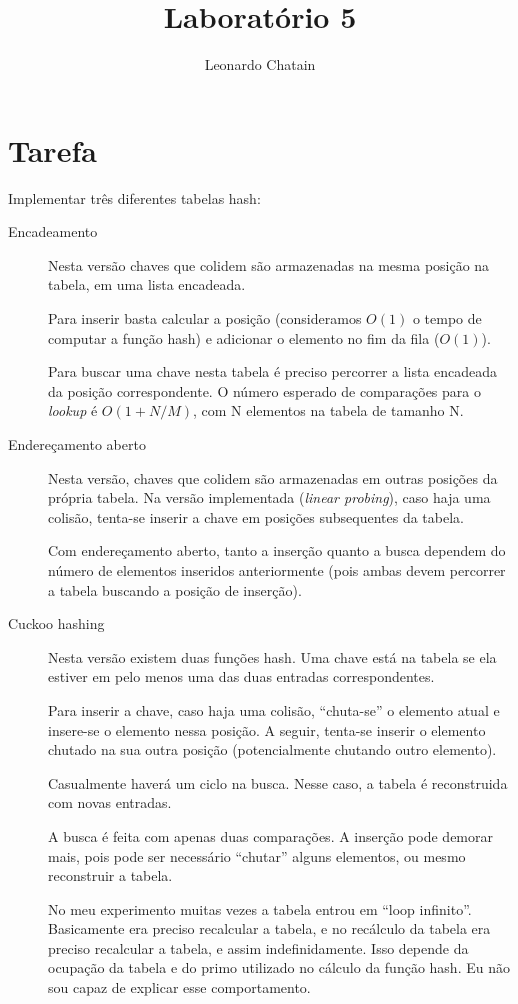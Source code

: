\documentclass{article}
\title{Laboratório 5}
\author{Leonardo Chatain}
\begin{document}
\maketitle

\section{Tarefa}
Implementar três diferentes tabelas hash:

\begin{description}
 \item[Encadeamento] Nesta versão chaves que colidem são armazenadas na mesma posição na
tabela, em uma lista encadeada.

Para inserir basta calcular a posição (consideramos $O(1)$ o tempo de computar a função hash) e
adicionar o elemento no fim da fila ($O(1)$).

Para buscar uma chave nesta tabela é preciso percorrer a lista encadeada da posição
correspondente. O número esperado de comparações para o \emph{lookup} é $O(1 + N/M)$, com N
elementos na tabela de tamanho N.

 \item[Endereçamento aberto] Nesta versão, chaves que colidem são armazenadas em outras
posições da própria tabela. Na versão implementada (\emph{linear probing}), caso haja uma colisão,
tenta-se inserir a chave em posições subsequentes da tabela.

Com endereçamento aberto, tanto a inserção quanto a busca dependem do número de elementos inseridos
anteriormente (pois ambas devem percorrer a tabela buscando a posição de inserção).

 \item[Cuckoo hashing] Nesta versão existem duas funções hash. Uma chave está na tabela se ela
estiver em pelo menos uma das duas entradas correspondentes.

Para inserir a chave, caso haja uma colisão, ``chuta-se'' o elemento atual e insere-se o elemento
nessa posição. A seguir, tenta-se inserir o elemento chutado na sua outra posição (potencialmente
chutando outro elemento).

Casualmente haverá um ciclo na busca. Nesse caso, a tabela é reconstruida com novas entradas.

A busca é feita com apenas duas comparações. A inserção pode demorar mais, pois pode ser necessário
``chutar'' alguns elementos, ou mesmo reconstruir a tabela.

No meu experimento muitas vezes a tabela entrou em ``loop infinito''. Basicamente era preciso
recalcular a tabela, e no recálculo da tabela era preciso recalcular a tabela, e assim
indefinidamente. Isso depende da ocupação da tabela e do primo utilizado no cálculo da função hash.
Eu não sou capaz de explicar esse comportamento.

\end{description}
\end{document}
